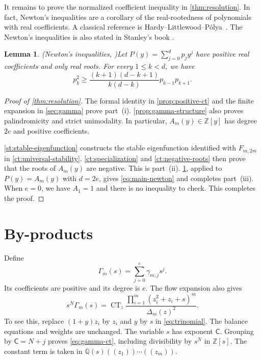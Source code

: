 \documentclass[reqno, 12pt]{article}
\numberwithin{equation}{section}
\newtheorem{lemma}[theorem]{Lemma}
\theoremstyle{definition}
\DeclareMathOperator{\CT}{CT}
\newcommand{\ZZ}{\mathbb Z}
\begin{document}
It remains to prove the normalized coefficient inequality in \cref{thm:resolution}.  In fact, Newton's inequalities are a corollary of the real-rootedness of polynomials with real coefficients.
A classical reference is Hardy--Littlewood--P\'olya~\cite[\S2.22, Theorem~51, p.~52;\S4.3, Theorem~144, pp.~104--105]{HLP}.
The Newton's inequalities is also stated in Stanley's book \cite[Chapter 5]{RP.StanleyAC}.

\begin{lemma}{\em (Newton's inequalities, \cite[Chapter 5]{RP.StanleyAC})}\label{lem:newton}
Let $P(y)=\sum_{j=0}^d p_jy^j$ have positive real coefficients and only real roots.  For every $1\leq k<d$, we have 
\begin{equation*}
p_k^2\geq\frac{(k+1)(d-k+1)}{k(d-k)}p_{k-1}p_{k+1}.
\end{equation*}
\end{lemma}


\begin{proof}[Proof of \cref{thm:resolution}]
The formal identity in \cref{prop:positive-ct} and
the finite expansion in \cref{sec:gamma} prove
part~\textup{(i)}. \cref{prop:gamma-structure}
also proves palindromicity and strict unimodality.  In particular,
$A_m(y)\in\ZZ[y]$ has degree $2e$ and positive coefficients.

\cref{st:stable-eigenfunction} constructs the stable
eigenfunction identified with $F_{m,2m}$ in
\cref{ct:universal-stability}.
\cref{ct:specialization} and
\cref{ct:negative-roots} then prove that the roots of
$A_m(y)$ are negative.  This is part~\textup{(ii)}.
\cref{lem:newton}, applied to $P(y)=A_m(y)$ with $d=2e$,
gives \eqref{eq:main-newton} and completes part~\textup{(iii)}.
When $e=0$, we have $A_1=1$ and there is no inequality to check.
This completes the proof.
\end{proof}


\section{By-products}\label{sec:consequences}

Define
\begin{equation}\label{eq:gamma-polynomial}
\Gamma_m(s)=\sum_{j=0}^e\gamma_{m,j}s^j.
\end{equation}
Its coefficients are positive and its degree is $e$.  The flow
expansion also gives
\begin{equation}\label{eq:gamma-ct}
s^N\Gamma_m(s)
=\CT_z\frac{\prod_{i=1}^m(z_i^2+z_i+s)^m}{\Delta_m(z)^2}.
\end{equation}
To see this, replace $(1+y)z_i$ by $z_i$ and $y$ by $s$
in \eqref{eq:trinomial}.  The balance equations and weights
are unchanged.
The variable $s$ has exponent $\mathsf C$.
Grouping by $\mathsf C=N+j$ proves \eqref{eq:gamma-ct}, including divisibility by $s^N$ in
$\ZZ[s]$.  The constant term is taken in
$\mathbb Q(s)((z_1))\cdots((z_m))$.
\end{document}
